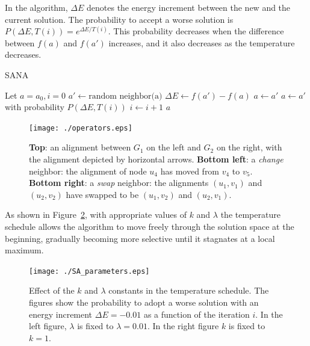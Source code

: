 \documentclass{bioinfo}
\begin{document}
\begin{methods}
In the algorithm, $\Delta E$ denotes the energy increment between the new and the current solution. The probability to accept a worse solution is $P(\Delta E, T(i)) = e^{\Delta E/T(i)}$. This probability decreases when the difference between $f(a)$ and $f(a')$ increases, and it also decreases as the temperature decreases.

\begin{algorithm}
\caption{SANA}\label{alg:SANA}
\begin{algorithmic}[1]
\State Let $a=a_0, i=0$
\State $a'\gets \mbox{random neighbor(a)}$
\State $\Delta E \gets f(a')-f(a)$
 $a\gets a'$
\Else \State $a\gets a'$ with probability $P(\Delta E, T(i))$
\EndIf
\State $i \gets i+1$
\EndWhile
\State \Return $a$
\end{algorithmic}
\end{algorithm}

\begin{figure}
\centering
\texttt{[image: ./operators.eps]}
\caption{{\bf Top}: an alignment between $G_1$ on the left and $G_2$ on the right, with the alignment depicted by horizontal arrows.
{\bf Bottom left}: a {\it change} neighbor: the alignment of node $u_4$ has moved from $v_4$ to $v_5$.
{\bf Bottom right}: a {\it swap} neighbor: the alignments $(u_1,v_1)$ and $(u_2,v_2)$ have swapped to be $(u_1,v_2)$ and $(u_2,v_1)$.}
\label{fig:operators}
\end{figure}

As shown in Figure~\ref{fig:parameters}, with appropriate values of $k$ and $\lambda$ the temperature schedule allows the algorithm to move freely through the solution space at the beginning, gradually becoming more selective until it stagnates at a local maximum.

\begin{figure}
\centering
\texttt{[image: ./SA\_parameters.eps]}
\caption{Effect of the $k$ and $\lambda$ constants in the temperature schedule. The figures show the probability to adopt a worse solution with an energy increment $\Delta E = -0.01$ as a function of the iteration $i$. In the left figure, $\lambda$ is fixed to $\lambda=0.01$. In the right figure $k$ is fixed to $k=1$.}
\label{fig:parameters}
\end{figure}


\end{methods}
\end{document}
